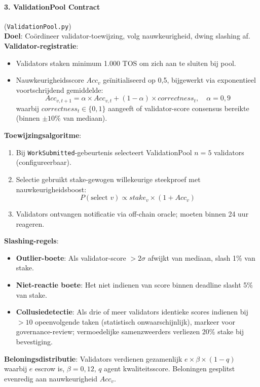 \documentclass[11pt]{article}
\begin{document}
\paragraph{3. ValidationPool Contract} (\texttt{ValidationPool.py})\\
\textbf{Doel}: Coördineer validator-toewijzing, volg nauwkeurigheid, dwing slashing af.\\
\textbf{Validator-registratie}:
\begin{itemize}[noitemsep]
  \item Validators staken minimum 1.000 TOS om zich aan te sluiten bij pool.
  \item Nauwkeurigheidsscore $Acc_v$ geïnitialiseerd op 0,5, bijgewerkt via exponentieel voortschrijdend gemiddelde:
    \begin{equation}
    Acc_{v,t+1} = \alpha \times Acc_{v,t} + (1-\alpha) \times correctness_t, \quad \alpha = 0,9
    \end{equation}
    waarbij $correctness_t \in \{0,1\}$ aangeeft of validator-score consensus bereikte (binnen $\pm10\%$ van mediaan).
\end{itemize}
\textbf{Toewijzingsalgoritme}:
\begin{enumerate}[noitemsep]
  \item Bij \texttt{WorkSubmitted}-gebeurtenis selecteert ValidationPool $n=5$ validators (configureerbaar).
  \item Selectie gebruikt stake-gewogen willekeurige steekproef met nauwkeurigheidsboost:
    \begin{equation}
    P(\text{select } v) \propto stake_v \times (1 + Acc_v)
    \end{equation}
  \item Validators ontvangen notificatie via off-chain oracle; moeten binnen 24 uur reageren.
\end{enumerate}
\textbf{Slashing-regels}:
\begin{itemize}[noitemsep]
  \item \textbf{Outlier-boete}: Als validator-score $>2\sigma$ afwijkt van mediaan, slash 1\% van stake.
  \item \textbf{Niet-reactie boete}: Het niet indienen van score binnen deadline slasht 5\% van stake.
  \item \textbf{Collusiedetectie}: Als drie of meer validators identieke scores indienen bij $>10$ opeenvolgende taken (statistisch onwaarschijnlijk), markeer voor governance-review; vermoedelijke samenzweerders verliezen 20\% stake bij bevestiging.
\end{itemize}
\textbf{Beloningsdistributie}: Validators verdienen gezamenlijk $e \times \beta \times (1-q)$ waarbij $e$ escrow is, $\beta=0,12$, $q$ agent kwaliteitsscore. Beloningen gesplitst evenredig aan nauwkeurigheid $Acc_v$.
\end{document}
